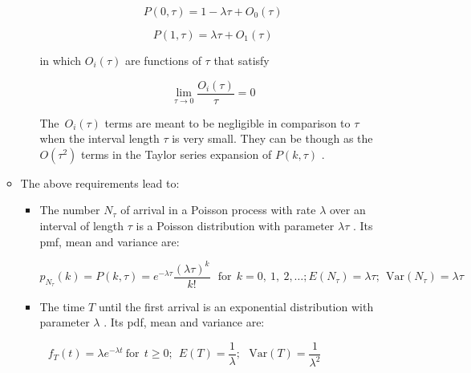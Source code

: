 \documentclass[12pt]{report}
\renewcommand{\_}{\kern-1.5pt\textunderscore\kern-1.5pt}
\begin{document}
\begin{itemize}
\begin{itemize}
\begin{itemize}
 \[ P \left( 0, \tau \right) =1- \lambda  \tau+O_{0} \left(  \tau \right)  \] \par

 \[ P \left( 1, \tau \right) = \lambda  \tau+O_{1} \left(  \tau \right)  \] \par

in which  \( O_{i} \left(  \tau \right)  \)  are functions of  \(  \tau \)  that satisfy \par

 \[ \mathop{\lim }_{ \tau \rightarrow 0}\frac{O_{i} \left(  \tau \right) }{ \tau}=0 \] \par

The\   \( O_{i} \left(  \tau \right)  \)  terms are meant to be negligible in comparison to  \(  \tau \)  when the interval length  \(  \tau \)  is very small. They can be though as the  \( O \left(  \tau^{2} \right)  \)  terms in the Taylor series expansion of  \( P \left( k, \tau \right)  \) .\par


\end{itemize}
	\item The above requirements lead to:\par

\begin{itemize}
	\item The number  \( N_{ \tau} \)  of arrival in a Poisson process with rate  \(  \lambda  \)  over an interval of length  \(  \tau \)  is a Poisson distribution with parameter  \(  \lambda  \tau \) . Its pmf, mean and variance are:\par

 \[ p_{N_{ \tau}} \left( k \right) =P \left( k, \tau \right) =e^{- \lambda  \tau}\frac{ \left(  \lambda  \tau \right) ^{k}}{k!}~~~\mathrm{for~~}k=0,~1,~2, \ldots ;   E \left( N_{ \tau} \right) = \lambda  \tau;~~ \mathrm{Var} \left( N_{ \tau} \right) = \lambda  \tau \] \par

	\item The time  \( T \)  until the first arrival is an exponential distribution with parameter  \(  \lambda  \) . Its pdf, mean and variance are:
\end{itemize}
\end{itemize}
\end{itemize}\par

\begin{adjustwidth}{1.0in}{0.0in}
 \[ f_{T} \left( t \right) = \lambda e^{- \lambda t}~\mathrm{for~~}t \geq 0;~~ E \left( T \right) =\frac{1}{ \lambda };~~~\mathrm{Var} \left( T \right) =\frac{1}{ \lambda ^{2}} \] \par

\end{adjustwidth}
\end{document}

